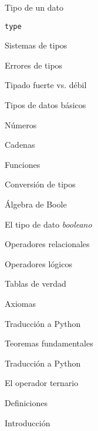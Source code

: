 \begin{longenum}
\begin{longenum}
\begin{longenum}
            \item Tipo de un dato
            \item \texttt{type}
            \item Sistemas de tipos
            \begin{longenum}
                \item Errores de tipos
                \item Tipado fuerte vs. débil
            \end{longenum}
            \item Tipos de datos básicos
            \begin{longenum}
                \item Números
                \item Cadenas
                \item Funciones
            \end{longenum}
            \item Conversión de tipos
        \end{longenum}
        \item Álgebra de Boole
        \begin{longenum}
            \item El tipo de dato \textit{booleano}
            \item Operadores relacionales
            \item Operadores lógicos
            \begin{longenum}
                \item Tablas de verdad
            \end{longenum}
            \item Axiomas
            \begin{longenum}
                \item Traducción a Python
            \end{longenum}
            \item Teoremas fundamentales
            \begin{longenum}
                \item Traducción a Python
            \end{longenum}
            \item El operador ternario
        \end{longenum}
        \item Definiciones
        \begin{longenum}
            \item Introducción

\end{longenum}
\end{longenum}
\end{longenum}
